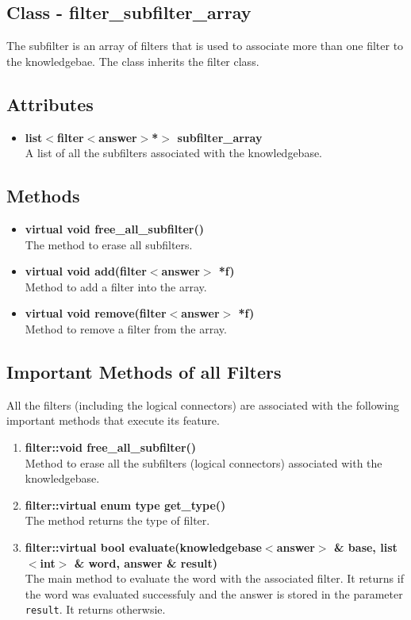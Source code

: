 \subsection{Class - filter\_subfilter\_array}
The subfilter is an array of filters that is used to associate more than one filter to the knowledgebae. The class inherits the filter class.
\subsection*{Attributes}
\begin{itemize}
 \item \textbf{list$<$filter$<$answer$>$*$>$ subfilter\_array} \\
	A list of all the subfilters associated with the knowledgebase.
\end{itemize}
\subsection*{Methods}
\begin{itemize}
 \item \textbf{virtual void free\_all\_subfilter()} \\
	The method to erase all subfilters.
 \item \textbf{virtual void add(filter$<$answer$>$ *f)} \\
	Method to add a filter into the array.
 \item \textbf{virtual void remove(filter$<$answer$>$ *f)} \\
	Method to remove a filter from the array.
\end{itemize}

\subsection{Important Methods of all Filters}

All the filters (including the logical connectors) are associated with the following important methods that execute its feature.

\begin{enumerate}
 
\item \textbf{filter::void free\_all\_subfilter()} \\
	Method to erase all the subfilters (logical connectors) associated with the knowledgebase.
 \item \textbf{filter::virtual enum type get\_type()} \\
	The method returns the type of filter. 
 \item \textbf{filter::virtual bool evaluate(knowledgebase$<$answer$>$ \& base, list$<$int$>$ \& word, answer \& result)} \\
	The main method to evaluate the word with the associated filter. It returns \true if the word was evaluated successfuly and the answer is stored in the parameter \texttt{result}. It returns \false otherwsie.
\end{enumerate}


